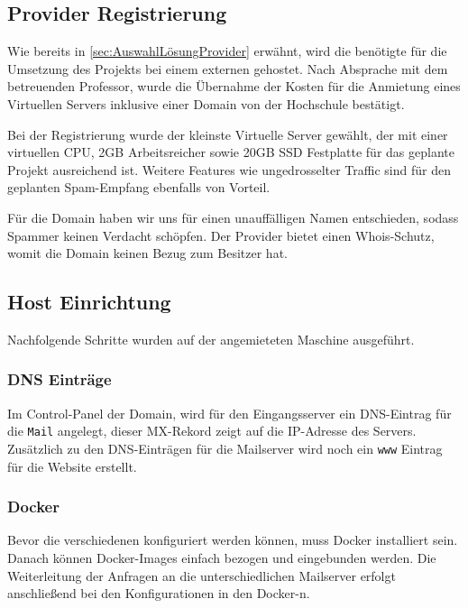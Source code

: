 \documentclass[a4paper,11pt,singlespacing]{article}
\begin{document}
	\subsection{Provider Registrierung}\label{sec:ProviderRegistrierung} 
		Wie bereits in \autoref{sec:AuswahlLösungProvider} erwähnt, wird die benötigte  für die Umsetzung des Projekts bei einem externen  gehostet.
		Nach Absprache mit dem betreuenden Professor, wurde die Übernahme der Kosten für die Anmietung eines Virtuellen Servers inklusive einer Domain von der Hochschule bestätigt.

		Bei der Registrierung wurde der kleinste Virtuelle Server gewählt, der mit einer virtuellen CPU, 2GB Arbeitsreicher sowie 20GB SSD Festplatte für das geplante Projekt ausreichend ist.
		Weitere Features wie ungedrosselter Traffic sind für den geplanten Spam-Empfang ebenfalls von Vorteil.
		
		Für die Domain haben wir uns für einen unauffälligen Namen entschieden, sodass Spammer keinen Verdacht schöpfen.
		Der Provider bietet einen Whois-Schutz, womit die Domain keinen Bezug zum Besitzer hat.
		
	\subsection{Host Einrichtung}\label{sec:UmsetzungHostEinrichtung}
		Nachfolgende Schritte wurden auf der angemieteten Maschine ausgeführt.
		
		\subsubsection{DNS Einträge}\label{sec:DNSEinträge}
			Im Control-Panel der Domain, wird für den Eingangsserver ein DNS-Eintrag für die \texttt{Mail} angelegt, dieser MX-Rekord zeigt auf die IP-Adresse des Servers.
			Zusätzlich zu den DNS-Einträgen für die Mailserver wird noch ein \texttt{www} Eintrag für die Website erstellt.

		\subsubsection{Docker}\label{sec:DockerAufsetzen}
			Bevor die verschiedenen  konfiguriert werden können, muss Docker installiert sein.
			Danach können Docker-Images einfach bezogen und eingebunden werden.
			Die Weiterleitung der Anfragen an die unterschiedlichen Mailserver erfolgt anschlie{\ss}end bei den Konfigurationen in den Docker-n.
	
\end{document}
